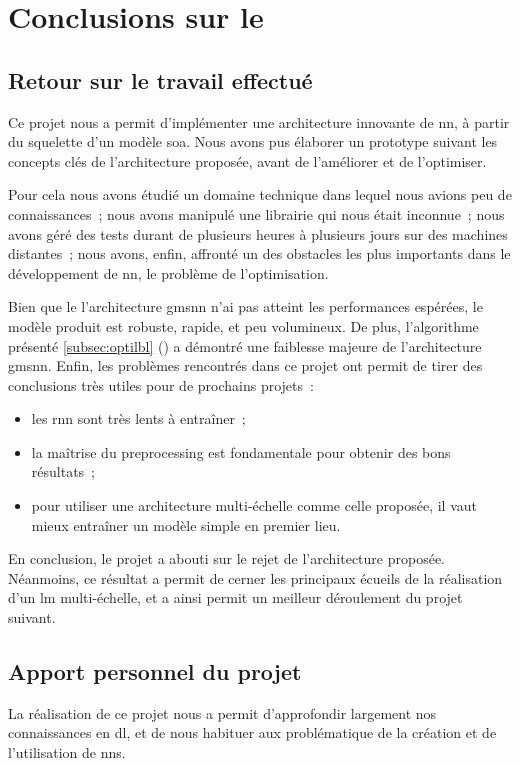 \chapter{Conclusions sur le }
\section{Retour sur le travail effectué}
Ce projet nous a permit d'implémenter une architecture innovante de \gls{nn}, à partir du squelette d'un modèle \gls{soa}.
Nous avons pus élaborer un prototype suivant les concepts clés de l'architecture proposée, avant de l'améliorer et de l'optimiser.

Pour cela nous avons étudié un domaine technique dans lequel nous avions peu de connaissances~; nous avons manipulé une librairie qui nous était inconnue~;
nous avons géré des tests durant de plusieurs heures à plusieurs jours sur des machines distantes~; nous avons, enfin, affronté un des obstacles les plus importants dans le développement de \gls{nn}, le problème de l'optimisation.

Bien que le l'architecture \gls{gmsnn} n'ai pas atteint les performances espérées, le modèle produit est robuste, rapide, et peu volumineux.
De plus, l'algorithme présenté \autoref{subsec:optilbl} () a démontré une faiblesse majeure de l'architecture \gls{gmsnn}.
Enfin, les problèmes rencontrés dans ce projet ont permit de tirer des conclusions très utiles pour de prochains projets~:
\begin{itemize}
	\item les \gls{rnn} sont très lents à entraîner~;
	\item la maîtrise du \gls{preprocessing} est fondamentale pour obtenir des bons résultats~;
	\item pour utiliser une architecture multi-échelle comme celle proposée, il vaut mieux entraîner un modèle simple en premier lieu.
\end{itemize}\hspace{1em}

En conclusion, le projet a abouti sur le rejet de l'architecture proposée.
Néanmoins, ce résultat a permit de cerner les principaux écueils de la réalisation d'un \gls{lm} multi-échelle, et a ainsi permit un meilleur déroulement du projet suivant.


\section{Apport personnel du projet}
La réalisation de ce projet nous a permit d'approfondir largement nos connaissances en \gls{dl}, et de nous habituer aux problématique de la création et de l'utilisation de \glspl{nn}.

